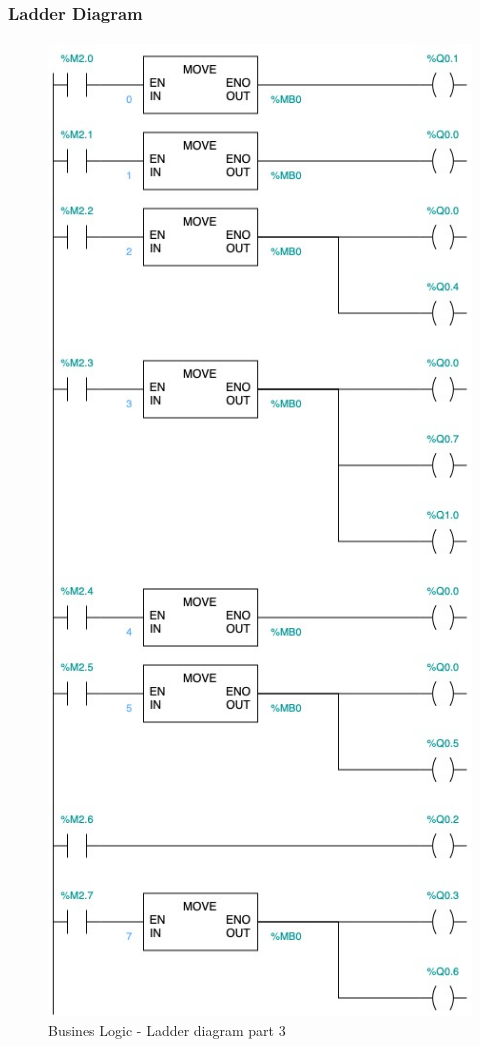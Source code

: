\documentclass[12pt]{beamer}
\begin{document}
\begin{frame}
\frametitle{Ladder Diagram}
\framesubtitle{}
\begin{figure}
    \centering
    \includegraphics[trim={0 0cm 0 23cm}, clip, scale=.5]{img/Ladder_diagram_3.jpg}
    \caption{Busines Logic - Ladder diagram part 3}
    \label{fig:ladder33}
\end{figure}
\end{frame}
\end{document}
